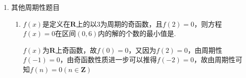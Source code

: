 \begin{enumerate}
\begin{enumerate}
\begin{jieda}
        进阶版：$f(x+a) + f(x+b) = c\Leftrightarrow 2|a-b|$是$f(x)$的一个周期。 \\
        $f(x) \cdot f(x+t) = c (c \neq 0)\Leftrightarrow 2t$是$f(x)$的一个周期。\\
        进阶版：$f(x+a) \cdot f(x+b) = c (c \neq 0)\Leftrightarrow 2|a-b|$是$f(x)$的一个周期。
        \end{jieda}
        \item 已知$f(x)$是$\bR$上的函数, 且$f(x+2)(1-f(x))=1+f(x)$. 
        \begin{jieda}
        \begin{enumerate}[1.]
        \item 若$f(x)$为常数函数, 则设为$f(x)=t$, 于是$t(1-t)=1+t$, 无解, 故$f(x)$不是常函数. 
        综上, $f(x)$是周期为8的周期函数.
        \item $f(2020)=f(4)=-\sqrt{3}$. 
        \end{enumerate}
        \end{jieda}
    \end{enumerate}
    \item 其他周期性题目
    \begin{enumerate}
        \item $f(x)$是定义在$\mathbf{R}$上的以3为周期的奇函数，且$f(2) = 0$，则方程$f(x) = 0$在区间$(0, 6)$内的解的个数的最小值是. 
        \begin{jieda}
            $f(x)$为$\mathbf{R}$上奇函数，故$f(0) = 0$，又因为$f(2) = 0$，由周期性$f(-1) = 0$，由奇函数性质进一步可以推得$f(-2) = 0$，故由周期性可知$f(n) = 0 (n \in \mathbf{Z})$ \\

\end{jieda}
\end{enumerate}
\end{enumerate}
